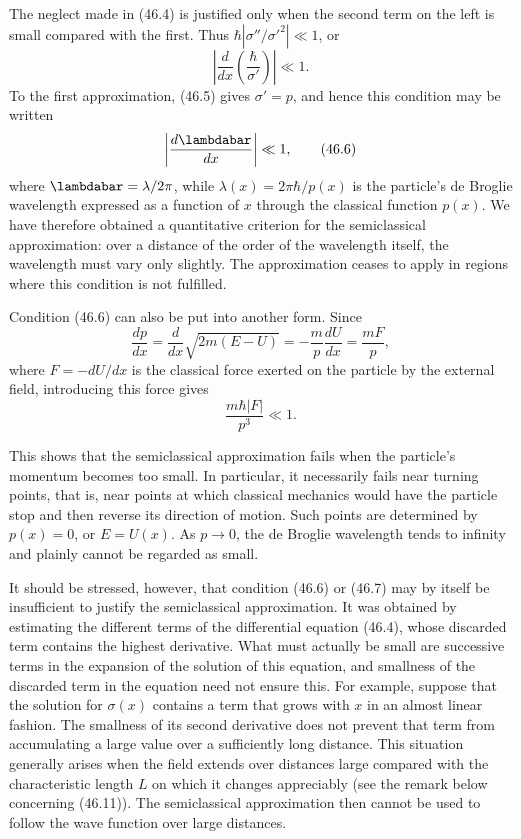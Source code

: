 The neglect made in (46.4) is justified only when the second term on the left
is small compared with the first. Thus
$\hbar|\sigma''/\sigma'^2|\ll1$, or
\[
  \left|\frac d{dx}\left(\frac\hbar{\sigma'}\right)\right|\ll1.
\]
To the first approximation, (46.5) gives $\sigma'=p$, and hence this condition
may be written
\begin{equation}
  \left|\frac{d\lambdabar}{dx}\right|\ll1,
  \tag{46.6}
\end{equation}
where $\lambdabar=\lambda/2\pi$, while
$\lambda(x)=2\pi\hbar/p(x)$ is the particle's de Broglie wavelength expressed
as a function of $x$ through the classical function $p(x)$. We have therefore
obtained a quantitative criterion for the semiclassical approximation: over a
distance of the order of the wavelength itself, the wavelength must vary only
slightly. The approximation ceases to apply in regions where this condition
is not fulfilled.

Condition (46.6) can also be put into another form. Since
\[
  \frac{dp}{dx}=\frac d{dx}\sqrt{2m(E-U)}=-\frac mp\frac{dU}{dx}=\frac{mF}{p},
\]
where $F=-dU/dx$ is the classical force exerted on the particle by the
external field, introducing this force gives
\begin{equation}
  \frac{m\hbar|F|}{p^3}\ll1.
  \tag{46.7}
\end{equation}

This shows that the semiclassical approximation fails when the particle's
momentum becomes too small. In particular, it necessarily fails near turning
points, that is, near points at which classical mechanics would have the
particle stop and then reverse its direction of motion. Such points are
determined by $p(x)=0$, or $E=U(x)$. As $p\to0$, the de Broglie wavelength
tends to infinity and plainly cannot be regarded as small.

It should be stressed, however, that condition (46.6) or (46.7) may by itself
be insufficient to justify the semiclassical approximation. It was obtained
by estimating the different terms of the differential equation (46.4), whose
discarded term contains the highest derivative. What must actually be small
are successive terms in the expansion of the solution of this equation, and
smallness of the discarded term in the equation need not ensure this. For
example, suppose that the solution for $\sigma(x)$ contains a term that grows
with $x$ in an almost linear fashion. The smallness of its second derivative
does not prevent that term from accumulating a large value over a sufficiently
long distance. This situation generally arises when the field extends over
distances large compared with the characteristic length $L$ on which it
changes appreciably (see the remark below concerning (46.11)). The
semiclassical approximation then cannot be used to follow the wave function
over large distances.

